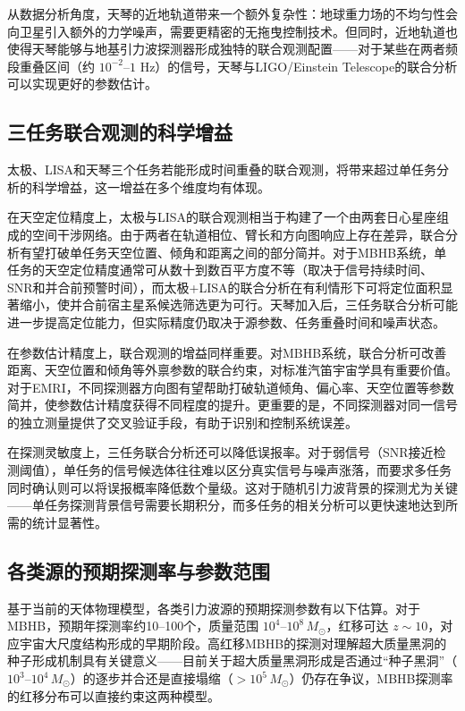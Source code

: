 从数据分析角度，天琴的近地轨道带来一个额外复杂性：地球重力场的不均匀性会向卫星引入额外的力学噪声，需要更精密的无拖曳控制技术。但同时，近地轨道也使得天琴能够与地基引力波探测器形成独特的联合观测配置——对于某些在两者频段重叠区间（约 $10^{-2}$--$1$ Hz）的信号，天琴与LIGO/Einstein Telescope的联合分析可以实现更好的参数估计。

\subsection{三任务联合观测的科学增益}

太极、LISA和天琴三个任务若能形成时间重叠的联合观测，将带来超过单任务分析的科学增益，这一增益在多个维度均有体现。

在天空定位精度上，太极与LISA的联合观测相当于构建了一个由两套日心星座组成的空间干涉网络。由于两者在轨道相位、臂长和方向图响应上存在差异，联合分析有望打破单任务天空位置、倾角和距离之间的部分简并。对于MBHB系统，单任务的天空定位精度通常可从数十到数百平方度不等（取决于信号持续时间、SNR和并合前预警时间），而太极+LISA的联合分析在有利情形下可将定位面积显著缩小，使并合前宿主星系候选筛选更为可行。天琴加入后，三任务联合分析可能进一步提高定位能力，但实际精度仍取决于源参数、任务重叠时间和噪声状态。

在参数估计精度上，联合观测的增益同样重要。对MBHB系统，联合分析可改善距离、天空位置和倾角等外禀参数的联合约束，对标准汽笛宇宙学具有重要价值。对于EMRI，不同探测器方向图有望帮助打破轨道倾角、偏心率、天空位置等参数简并，使参数估计精度获得不同程度的提升。更重要的是，不同探测器对同一信号的独立测量提供了交叉验证手段，有助于识别和控制系统误差。

在探测灵敏度上，三任务联合分析还可以降低误报率。对于弱信号（SNR接近检测阈值），单任务的信号候选体往往难以区分真实信号与噪声涨落，而要求多任务同时确认则可以将误报概率降低数个量级。这对于随机引力波背景的探测尤为关键——单任务探测背景信号需要长期积分，而多任务的相关分析可以更快速地达到所需的统计显著性。

\subsection{各类源的预期探测率与参数范围}

基于当前的天体物理模型，各类引力波源的预期探测参数有以下估算。对于MBHB，预期年探测率约10--100个，质量范围 $10^4$--$10^8\,M_\odot$，红移可达 $z\sim10$，对应宇宙大尺度结构形成的早期阶段。高红移MBHB的探测对理解超大质量黑洞的种子形成机制具有关键意义——目前关于超大质量黑洞形成是否通过“种子黑洞”（$10^3$--$10^4\,M_\odot$）的逐步并合还是直接塌缩（$>10^5\,M_\odot$）仍存在争议，MBHB探测率的红移分布可以直接约束这两种模型。

